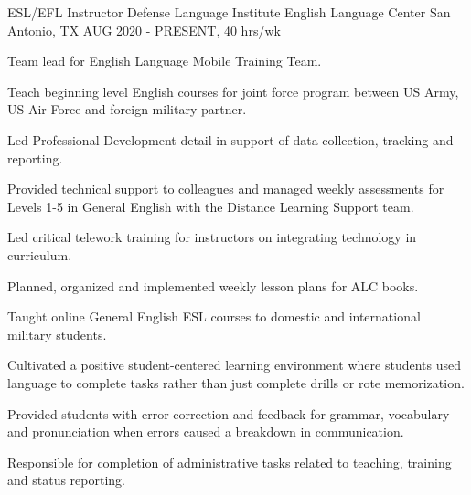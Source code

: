 


\begin{cventries}


\cventry
{ESL/EFL Instructor} %
{Defense Language Institute English Language Center} %
{San Antonio, TX} %
{AUG 2020 - PRESENT, 40 hrs/wk} %
{ %
\begin{cvitems}
\item {Team lead for English Language Mobile Training Team.}
\item {Teach beginning level English courses for joint force program between US Army, US Air Force and foreign military partner.}
\item {Led Professional Development detail in support of data collection, tracking and reporting.}
\item {Provided technical support to colleagues and managed weekly assessments for Levels 1-5 in General English with the Distance Learning Support team.}
\item {Led critical telework training for instructors on integrating technology in curriculum.}
\item {Planned, organized and implemented weekly lesson plans for ALC books.}
\item {Taught online General English ESL courses to domestic and international military students.}
\item {Cultivated a positive student-centered learning environment where students used language to complete tasks rather than just complete drills or rote memorization.}
\item {Provided students with error correction and feedback for grammar, vocabulary and pronunciation when errors caused a breakdown in communication.}
\item {Responsible for completion of administrative tasks related to teaching, training and status reporting.} 
\end{cvitems}
}


\end{cventries}
